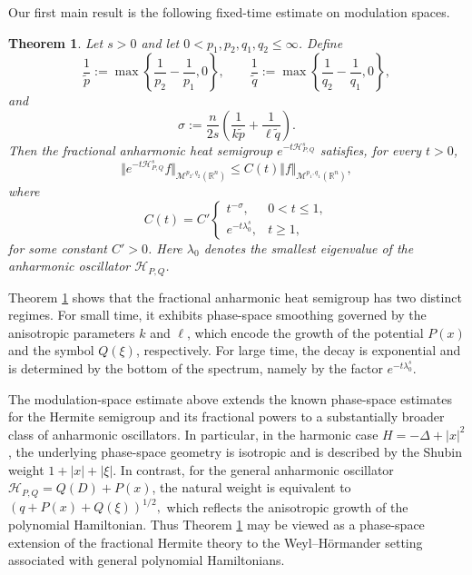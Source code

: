 \documentclass[12pt, reqno]{amsart}
\newcommand{\M}{\mathcal{M}}
\newtheorem{theorem}{Theorem}[section]
\theoremstyle{definition}
\theoremstyle{remark}
\numberwithin{equation}{section}
\newcommand{\APQ}{\mathcal{H}_{P, Q}}
\begin{document}
Our first main result is the following fixed-time estimate on modulation spaces.

\begin{theorem} \label{mainthmest}
Let $s>0$ and let $0<p_1,p_2,q_1,q_2\leq \infty$. Define
\[
\frac{1}{\widetilde p}
:=
\max\left\{
\frac{1}{p_2}-\frac{1}{p_1},0
\right\},
\qquad
\frac{1}{\widetilde q}
:=
\max\left\{
\frac{1}{q_2}-\frac{1}{q_1},0
\right\},
\]
and
\[
\sigma
:=
\frac{n}{2s}
\left(
\frac{1}{k\widetilde p}
+
\frac{1}{\ell\widetilde q}
\right).
\]
Then the fractional anharmonic heat semigroup $e^{-t\APQ^s}$ satisfies, for every $t>0$,
\begin{equation}
\label{mappinganharmonic}
\Vert e^{-t\APQ^{s}} f\Vert_{\M^{p_2,q_2}(\mathbb{R}^n)}
\leq
C(t)
\Vert f\Vert_{\M^{p_1,q_1}(\mathbb{R}^n)},
\end{equation}
where
\begin{equation}
\label{heatest}
C(t)
=
C'
\begin{cases}
t^{-\sigma}, & 0<t\leq 1,\\
e^{-t\lambda_0^s}, & t\geq 1,
\end{cases}
\end{equation}
for some constant $C'>0$. Here $\lambda_0$ denotes the smallest eigenvalue of the anharmonic oscillator $\APQ$.
\end{theorem}

Theorem \ref{mainthmest} shows that the fractional anharmonic heat semigroup has two distinct regimes. For small time, it exhibits phase-space smoothing governed by the anisotropic parameters $k$ and $\ell$, which encode the growth of the potential $P(x)$ and the symbol $Q(\xi)$, respectively. For large time, the decay is exponential and is determined by the bottom of the spectrum, namely by the factor $e^{-t\lambda_0^s}.$

The modulation-space estimate above extends the known phase-space estimates for the Hermite semigroup and its fractional powers to a substantially broader class of anharmonic oscillators. In particular, in the harmonic case $H=-\Delta+|x|^2$, the underlying phase-space geometry is isotropic and is described by the Shubin weight $1+|x|+|\xi|$. In contrast, for the general anharmonic oscillator $\mathcal H_{P,Q}=Q(D)+P(x)$, the natural weight is equivalent to $(q+P(x)+Q(\xi))^{1/2},$
which reflects the anisotropic growth of the polynomial Hamiltonian. Thus Theorem \ref{mainthmest} may be viewed as a phase-space extension of the fractional Hermite theory \cite{than:hs} to the Weyl--H\"ormander setting associated with general polynomial Hamiltonians.
\end{document}
